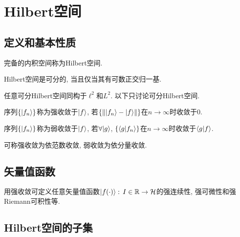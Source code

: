 \chapter{Hilbert空间}

\section{定义和基本性质}

\begin{definition}
    完备的内积空间称为Hilbert空间.
\end{definition}
\begin{theorem}
    Hilbert空间是可分的, 当且仅当其有可数正交归一基.
\end{theorem}
任意可分Hilbert空间同构于$\ell^2$和$L^2$. 以下只讨论可分Hilbert空间.

\begin{definition}
    序列$\{|f_n\rangle\}$称为强收敛于$|f\rangle$, 若$\{\left\lVert|f_n\rangle-|f\rangle\right\rVert\}$在$n\to\infty$时收敛于$0$.
\end{definition}
\begin{definition}
    序列$\{|f_n\rangle\}$称为弱收敛于$|f\rangle$, 若$\forall|g\rangle$, $\{\langle g|f_n\rangle\}$在$n\to\infty$时收敛于$\langle g|f\rangle$.
\end{definition}
可称强收敛为依范数收敛, 弱收敛为依分量收敛.

\section{矢量值函数}

用强收敛可定义任意矢量值函数$|f(\cdot)\rangle:\,I\in\mathbb{R}\to\mathcal{H}$的强连续性, 强可微性和强Riemann可积性等.

\section{Hilbert空间的子集}

